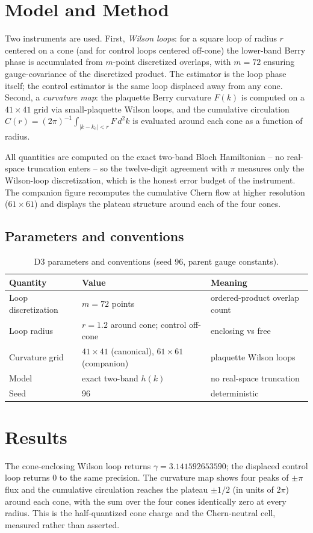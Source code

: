 \documentclass[11pt,a4paper]{article}
\begin{document}
\section{Model and Method}
Two instruments are used. First, \emph{Wilson loops}: for a square loop of radius $r$ centered on a cone (and for control loops centered off-cone) the lower-band Berry phase is accumulated from $m$-point discretized overlaps, with $m = 72$ ensuring gauge-covariance of the discretized product. The estimator is the loop phase itself; the control estimator is the same loop displaced away from any cone. Second, a \emph{curvature map}: the plaquette Berry curvature $F(k)$ is computed on a $41 \times 41$ grid via small-plaquette Wilson loops, and the cumulative circulation $C(r) = (2\pi)^{-1}\int_{|k-k_c|<r} F\,d^2k$ is evaluated around each cone as a function of radius.

All quantities are computed on the exact two-band Bloch Hamiltonian -- no real-space truncation enters -- so the twelve-digit agreement with $\pi$ measures only the Wilson-loop discretization, which is the honest error budget of the instrument. The companion figure recomputes the cumulative Chern flow at higher resolution ($61 \times 61$) and displays the plateau structure around each of the four cones.

\subsection{Parameters and conventions}
\begin{table}[htbp]\centering\small
\begin{tabularx}{\columnwidth}{@{}l l X@{}}
\toprule
Quantity & Value & Meaning \\
\midrule
Loop discretization & $m = 72$ points & ordered-product overlap count \\
Loop radius & $r = 1.2$ around cone; control off-cone & enclosing vs free \\
Curvature grid & $41\times41$ (canonical), $61\times61$ (companion) & plaquette Wilson loops \\
Model & exact two-band $h(k)$ & no real-space truncation \\
Seed & 96 & deterministic \\
\bottomrule
\end{tabularx}
\caption{D3 parameters and conventions (seed 96, parent gauge constants).}
\end{table}

\section{Results}
The cone-enclosing Wilson loop returns $\gamma = 3.141592653590$; the displaced control loop returns $0$ to the same precision. The curvature map shows four peaks of $\pm\pi$ flux and the cumulative circulation reaches the plateau $\pm 1/2$ (in units of $2\pi$) around each cone, with the sum over the four cones identically zero at every radius. This is the half-quantized cone charge and the Chern-neutral cell, measured rather than asserted.
\end{document}
